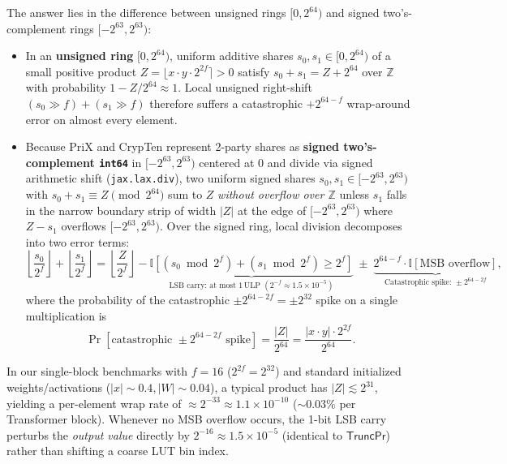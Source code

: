 \documentclass[11pt]{article}
\begin{document}
The answer lies in the difference between unsigned rings $[0, 2^{64})$ and signed two's-complement rings $[-2^{63}, 2^{63})$:
\begin{itemize}
    \item In an \textbf{unsigned ring} $[0, 2^{64})$, uniform additive shares $s_0, s_1 \in [0, 2^{64})$ of a small positive product $Z = \lfloor x \cdot y \cdot 2^{2f} \rceil > 0$ satisfy $s_0 + s_1 = Z + 2^{64}$ over $\mathbb{Z}$ with probability $1 - Z/2^{64} \approx 1$. Local unsigned right-shift $(s_0 \gg f) + (s_1 \gg f)$ therefore suffers a catastrophic $+2^{64-f}$ wrap-around error on almost every element.
    \item Because PriX and CrypTen represent 2-party shares as \textbf{signed two's-complement \texttt{int64}} in $[-2^{63}, 2^{63})$ centered at $0$ and divide via signed arithmetic shift (\texttt{jax.lax.div}), two uniform signed shares $s_0, s_1 \in [-2^{63}, 2^{63})$ with $s_0 + s_1 \equiv Z \pmod{2^{64}}$ sum to $Z$ \emph{without overflow over $\mathbb{Z}$} unless $s_1$ falls in the narrow boundary strip of width $|Z|$ at the edge of $[-2^{63}, 2^{63})$ where $Z - s_1$ overflows $[-2^{63}, 2^{63})$. Over the signed ring, local division decomposes into two error terms:
    \begin{equation}
        \left\lfloor \frac{s_0}{2^f} \right\rfloor + \left\lfloor \frac{s_1}{2^f} \right\rfloor
        = \left\lfloor \frac{Z}{2^f} \right\rfloor
        - \underbrace{\mathbb{I}\!\left[(s_0 \bmod 2^f) + (s_1 \bmod 2^f) \ge 2^f\right]}_{\text{LSB carry: at most } 1\,\text{ULP } (2^{-f} \approx 1.5\times 10^{-5})}
        \;\pm\; \underbrace{2^{64-f}\cdot \mathbb{I}[\text{MSB overflow}]}_{\text{Catastrophic spike: } \pm 2^{64-2f}},
        \label{eq:signed_crypten_trunc}
    \end{equation}
    where the probability of the catastrophic $\pm 2^{64-2f} = \pm 2^{32}$ spike on a single multiplication is
    \begin{equation}
        \Pr[\text{catastrophic }\pm 2^{64-2f}\text{ spike}] = \frac{|Z|}{2^{64}} = \frac{|x \cdot y|\cdot 2^{2f}}{2^{64}}.
        \label{eq:wrap_prob}
    \end{equation}
\end{itemize}
In our single-block benchmarks with $f = 16$ ($2^{2f} = 2^{32}$) and standard initialized weights/activations ($|x| \sim 0.4, |W| \sim 0.04$), a typical product has $|Z| \lesssim 2^{31}$, yielding a per-element wrap rate of $\approx 2^{-33} \approx 1.1\times 10^{-10}$ ($\sim 0.03\%$ per Transformer block). Whenever no MSB overflow occurs, the 1-bit LSB carry perturbs the \emph{output value} directly by $2^{-16} \approx 1.5\times 10^{-5}$ (identical to $\mathsf{TruncPr}$) rather than shifting a coarse LUT bin index.
\end{document}
